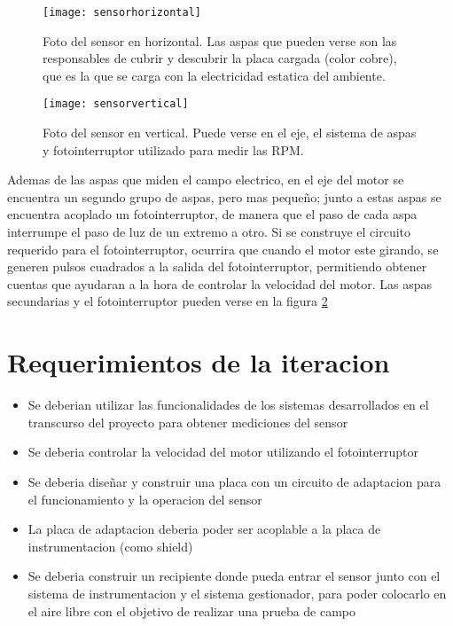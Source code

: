 \begin{figure}[h]
  \centering
  \texttt{[image: sensorhorizontal]}
  \caption[Imagen del sensor de campo electrostatico utilizado (horizontal)]{Foto del sensor en horizontal. Las aspas que pueden verse son las responsables de cubrir y descubrir la placa cargada (color cobre), que es la que se carga con la electricidad estatica del ambiente.}\label{fig:sensorhorizontal}
\end{figure}

\begin{figure}[h]
  \centering
  \texttt{[image: sensorvertical]}
  \caption[Imagen del sensor de campo electrostatico utilizado (vertical)]{Foto del sensor en vertical. Puede verse en el eje, el sistema de aspas y fotointerruptor utilizado para medir las RPM.}\label{fig:sensorvertical}
\end{figure}

Ademas de las aspas que miden el campo electrico, en el eje del motor se encuentra un segundo grupo de aspas, pero mas pequeño; junto a estas aspas se encuentra acoplado un fotointerruptor, de manera que el paso de cada aspa interrumpe el paso de luz de un extremo a otro. Si se construye el circuito requerido para el fotointerruptor, ocurrira que cuando el motor este girando, se generen pulsos cuadrados a la salida del fotointerruptor, permitiendo obtener cuentas que ayudaran a la hora de controlar la velocidad del motor. Las aspas secundarias y el fotointerruptor pueden verse en la figura \ref{fig:sensorvertical}



\section{Requerimientos de la iteracion} %
\label{sec:requerimientos_de_la_iteracion}

\begin{itemize}
\item Se deberian utilizar las funcionalidades de los sistemas desarrollados en el transcurso del proyecto para obtener mediciones del sensor
\item Se deberia controlar la velocidad del motor utilizando el fotointerruptor
\item Se deberia diseñar y construir una placa con un circuito de adaptacion para el funcionamiento y la operacion del sensor
\item La placa de adaptacion deberia poder ser acoplable a la placa de instrumentacion (como shield)
\item Se deberia construir un recipiente donde pueda entrar el sensor junto con el sistema de instrumentacion y el sistema gestionador, para poder colocarlo en el aire libre con el objetivo de realizar una prueba de campo
\end{itemize}


